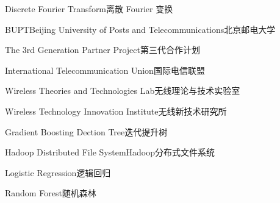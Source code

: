 

{Discrete Fourier Transform}{离散 Fourier 变换}

{BUPT}{Beijing University of Posts and Telecommunications}{北京邮电大学}

{The 3rd Generation Partner Project}{第三代合作计划}

{International Telecommunication Union}{国际电信联盟}

{Wireless Theories and Technologies Lab}{无线理论与技术实验室}

{Wireless Technology Innovation Institute}{无线新技术研究所}

{Gradient Boosting Dection Tree}{迭代提升树}

{Hadoop Distributed File System}{Hadoop分布式文件系统}

{Logistic Regression}{逻辑回归}

{Random Forest}{随机森林}
